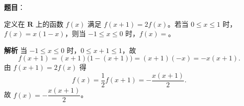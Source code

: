 \begin{answer}

\textbf{题目}：

定义在 $\mathbf R$ 上的函数 $f(x)$ 满足 $f(x+1)=2f(x)$。若当 $0\leqslant x\leqslant1$ 时，$f(x)=x(1-x)$，则当 $-1\leqslant x\leqslant0$ 时，$f(x)=$\gkblank{}。

\textbf{解析}
当 $-1\leqslant x\leqslant0$ 时，$0\leqslant x+1\leqslant1$，故
\nopagebreak[4]
\[f(x+1)=(x+1)\bigl(1-(x+1)\bigr)=(x+1)(-x)=-x(x+1).\]
由 $f(x+1)=2f(x)$ 得
\nopagebreak[4]
\[f(x)=\frac12f(x+1)=-\frac{x(x+1)}2.\]
故 $f(x)=-\dfrac{x(x+1)}2$。


\end{answer}
